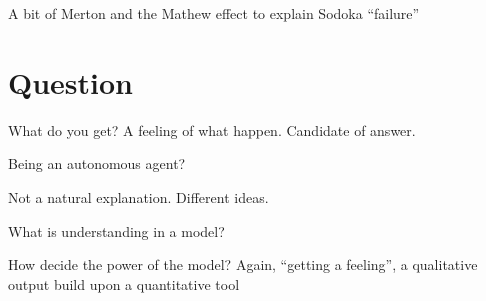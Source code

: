\documentclass[a4paper]{article}
\begin{document}
A bit of Merton and the Mathew effect to explain Sodoka ``failure''

\section{Question}
What do you get? A feeling of what happen. Candidate of answer.

Being an autonomous agent?


Not a natural explanation. Different ideas.



What is understanding in a model?

How decide the power of the model? Again, ``getting a feeling'', a qualitative output build upon a quantitative tool
\end{document}
